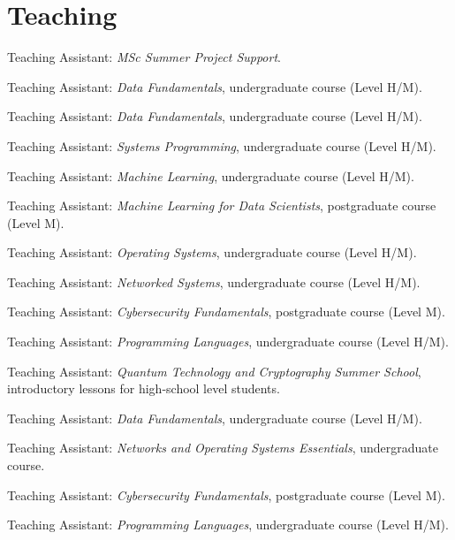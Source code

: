 \section{Teaching}
\begin{cvitemize}[2020--2021]
	\item Teaching Assistant: \emph{MSc Summer Project Support}.
	\item Teaching Assistant: \emph{Data Fundamentals}, undergraduate course (Level H/M).
\end{cvitemize}
\begin{cvitemize}[2019--2020]
	\item Teaching Assistant: \emph{Data Fundamentals}, undergraduate course (Level H/M).
	\item Teaching Assistant: \emph{Systems Programming}, undergraduate course (Level H/M).
	\item Teaching Assistant: \emph{Machine Learning}, undergraduate course (Level H/M).
	\item Teaching Assistant: \emph{Machine Learning for Data Scientists}, postgraduate course (Level M).
	\item Teaching Assistant: \emph{Operating Systems}, undergraduate course (Level H/M).
	\item Teaching Assistant: \emph{Networked Systems}, undergraduate course (Level H/M).
	\item Teaching Assistant: \emph{Cybersecurity Fundamentals}, postgraduate course (Level M).
	\item Teaching Assistant: \emph{Programming Languages}, undergraduate course (Level H/M).
\end{cvitemize}
\begin{cvitemize}[2018--2019]
	\item Teaching Assistant: \emph{Quantum Technology and Cryptography Summer School}, introductory lessons for high-school level students.
	\item Teaching Assistant: \emph{Data Fundamentals}, undergraduate course (Level H/M).
	\item Teaching Assistant: \emph{Networks and Operating Systems Essentials}, undergraduate course.
	\item Teaching Assistant: \emph{Cybersecurity Fundamentals}, postgraduate course (Level M).
	\item Teaching Assistant: \emph{Programming Languages}, undergraduate course (Level H/M).
\end{cvitemize}
